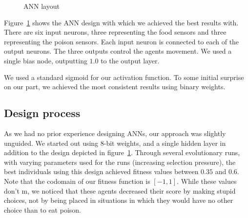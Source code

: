 \documentclass[twoside]{article}
\begin{document}
\begin{multicols}{2}
\begin{figure}[H]

    \caption{ANN layout} \label{fig:ann-layout}
  \end{figure}

  Figure~\ref{fig:ann-layout} shows the ANN design with which we achieved the best results with.
  There are six input neurons, three representing the food sensors and three representing the poison sensors.
  Each input neuron is connected to each of the output neurons.
  The three outputs control the agents movement.
  We used a single bias node, outputting $1.0$ to the output layer.

  We used a standard sigmoid for our activation function.
  To some initial surprise on our part, we achieved the most consistent results using binary weights.

  \subsection{Design process}

  As we had no prior experience designing ANNs, our approach was slightly unguided.
  We started out using 8-bit weights, and a single hidden layer in addition to the design depicted in figure~\ref{fig:ann-layout}.
  Through several evolutionary runs, with varying parameters used for the runs (increasing selection pressure), the best individuals using this design achieved fitness values between $0.35$ and $0.6$.
  Note that the codomain of our fitness function is $[-1, 1]$.
  While these values don't m, we noticed that these agents decreased their score by making stupid choices, not by being placed in situations in which they would have no other choice than to eat poison.


\end{multicols}
\end{document}
